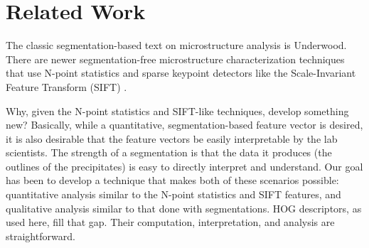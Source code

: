 \documentclass[review]{elsarticle}
\begin{document}
	\section{Related Work}\label{relatedwork}
		The classic segmentation-based text on microstructure analysis is Underwood\cite{underwood}. There are newer segmentation-free microstructure characterization techniques that use N-point statistics \cite{kalidindi1, kalidindi2} and sparse keypoint detectors like the Scale-Invariant Feature Transform (SIFT) \cite{decost}.

		Why, given the N-point statistics and SIFT-like techniques, develop something new? Basically, while a quantitative, segmentation-based feature vector is desired, it is also desirable that the feature vectors be easily interpretable by the lab scientists. The strength of a segmentation is that the data it produces (the outlines of the precipitates) is easy to directly interpret and understand. Our goal has been to develop a technique that makes both of these scenarios possible: quantitative analysis similar to the N-point statistics and SIFT features, and qualitative analysis similar to that done with segmentations. HOG descriptors, as used here, fill that gap. Their computation, interpretation, and analysis are straightforward.
	
	
	
	
\end{document}
